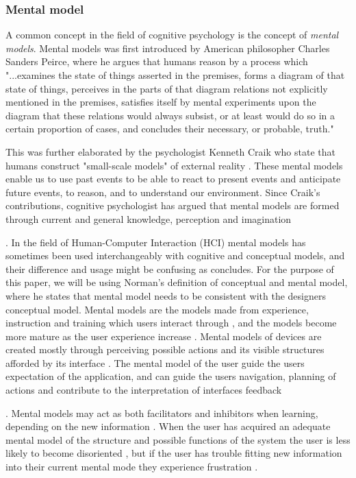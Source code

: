 \subsubsection{Mental model}
A common concept in the field of cognitive psychology is the concept of \textit{mental models}. Mental models was first introduced by American philosopher Charles Sanders Peirce, where he argues that humans reason by a process which
"...examines the state of things
asserted in the premises, forms a diagram of that state of things, perceives in the parts of that diagram relations not explicitly mentioned in the premises, satisfies itself by mental experiments upon the diagram that these relations would always subsist, or at least would do so in a certain proportion of cases, and concludes their necessary, or probable, truth." \cite{Pierce1974}

This was further elaborated by the psychologist Kenneth Craik who state that humans construct "small-scale models" of external reality \cite{Craik1967}. These mental models enable us to use past events to be able to react to present events and anticipate future events, to reason, and to understand our environment. Since Craik's contributions, cognitive psychologist has argued that mental models are formed through current and general knowledge, perception and imagination \cite{Johnson-Laird2001} . In the field of Human-Computer Interaction (HCI) mental models has sometimes been used interchangeably with cognitive and conceptual models, and their difference and usage might be confusing as \cite{Staggers1993} concludes. For the purpose of this paper, we will be using Norman's \cite{Norman2013a} definition of conceptual and mental model, where he states that mental model needs to be consistent with the designers conceptual model. Mental models are the models made from experience, instruction and training which users interact through \cite{Norman2013a}, and the models become more mature as the user experience increase \cite{Barker1998}. Mental models of devices are created mostly through perceiving possible actions and its visible structures afforded by its interface \cite{Norman2013a}. The mental model of the user guide the users expectation of the application, and can guide the users navigation, planning of actions and contribute to the interpretation of interfaces feedback \cite{Jih1992}. Mental models may act as both facilitators and inhibitors when learning, depending on the new information \cite{Cho1996}. When the user has acquired an adequate mental model of the structure and possible functions of the system the user is less likely to become disoriented \cite{Jih1992}, but if the user has trouble fitting new information into their current mental mode they experience frustration \cite{DApollonia2004}.

